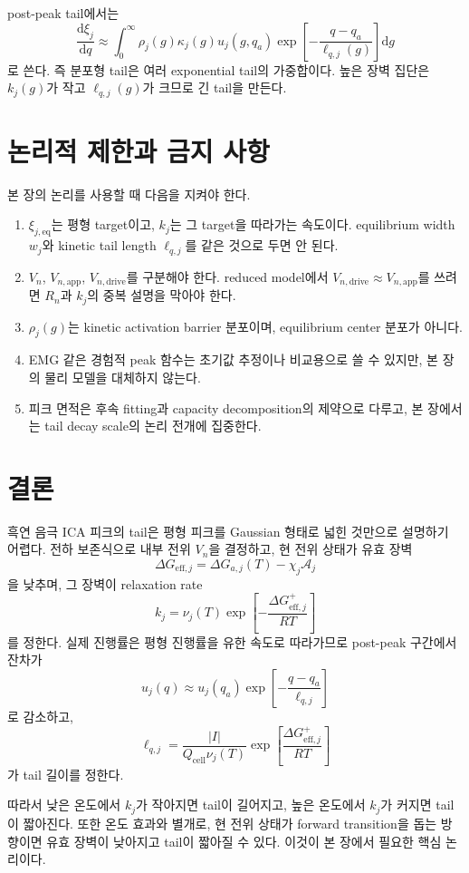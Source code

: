 \documentclass[11pt]{article}
\newcommand{\dd}{\mathrm{d}}
\newcommand{\cell}{\mathrm{cell}}
\newcommand{\app}{\mathrm{app}}
\newcommand{\drive}{\mathrm{drive}}
\newcommand{\eff}{\mathrm{eff}}
\begin{document}
post-peak tail에서는
\begin{equation}
\frac{\dd \xi_j}{\dd q}
\approx
\int_0^\infty
\rho_j(g)\kappa_j(g)u_j(g,q_a)
\exp\!\left[-\frac{q-q_a}{\ell_{q,j}(g)}\right]
\dd g
\end{equation}
로 쓴다. 즉 분포형 tail은 여러 exponential tail의 가중합이다. 높은 장벽 집단은 \(k_j(g)\)가 작고 \(\ell_{q,j}(g)\)가 크므로 긴 tail을 만든다.

\section{논리적 제한과 금지 사항}

본 장의 논리를 사용할 때 다음을 지켜야 한다.

\begin{enumerate}
\item \(\xi_{j,\mathrm{eq}}\)는 평형 target이고, \(k_j\)는 그 target을 따라가는 속도이다. equilibrium width \(w_j\)와 kinetic tail length \(\ell_{q,j}\)를 같은 것으로 두면 안 된다.
\item \(V_n\), \(V_{n,\app}\), \(V_{n,\drive}\)를 구분해야 한다. reduced model에서 \(V_{n,\drive}\approx V_{n,\app}\)를 쓰려면 \(R_n\)과 \(k_j\)의 중복 설명을 막아야 한다.
\item \(\rho_j(g)\)는 kinetic activation barrier 분포이며, equilibrium center 분포가 아니다.
\item EMG 같은 경험적 peak 함수는 초기값 추정이나 비교용으로 쓸 수 있지만, 본 장의 물리 모델을 대체하지 않는다.
\item 피크 면적은 후속 fitting과 capacity decomposition의 제약으로 다루고, 본 장에서는 tail decay scale의 논리 전개에 집중한다.
\end{enumerate}

\section{결론}

흑연 음극 ICA 피크의 tail은 평형 피크를 Gaussian 형태로 넓힌 것만으로 설명하기 어렵다. 전하 보존식으로 내부 전위 \(V_n\)을 결정하고, 현 전위 상태가 유효 장벽
\begin{equation}
\Delta G_{\eff,j}
=
\Delta G_{a,j}(T)-\chi_j\mathcal A_j
\end{equation}
을 낮추며, 그 장벽이 relaxation rate
\begin{equation}
k_j
=
\nu_j(T)\exp\!\left[-\frac{\Delta G_{\eff,j}^{+}}{RT}\right]
\end{equation}
를 정한다. 실제 진행률은 평형 진행률을 유한 속도로 따라가므로 post-peak 구간에서 잔차가
\begin{equation}
u_j(q)
\approx
u_j(q_a)
\exp\!\left[-\frac{q-q_a}{\ell_{q,j}}\right]
\end{equation}
로 감소하고,
\begin{equation}
\ell_{q,j}
=
\frac{|I|}{Q_{\cell}\nu_j(T)}
\exp\!\left[
\frac{\Delta G_{\eff,j}^{+}}{RT}
\right]
\end{equation}
가 tail 길이를 정한다.

따라서 낮은 온도에서 \(k_j\)가 작아지면 tail이 길어지고, 높은 온도에서 \(k_j\)가 커지면 tail이 짧아진다. 또한 온도 효과와 별개로, 현 전위 상태가 forward transition을 돕는 방향이면 유효 장벽이 낮아지고 tail이 짧아질 수 있다. 이것이 본 장에서 필요한 핵심 논리이다.
\end{document}
